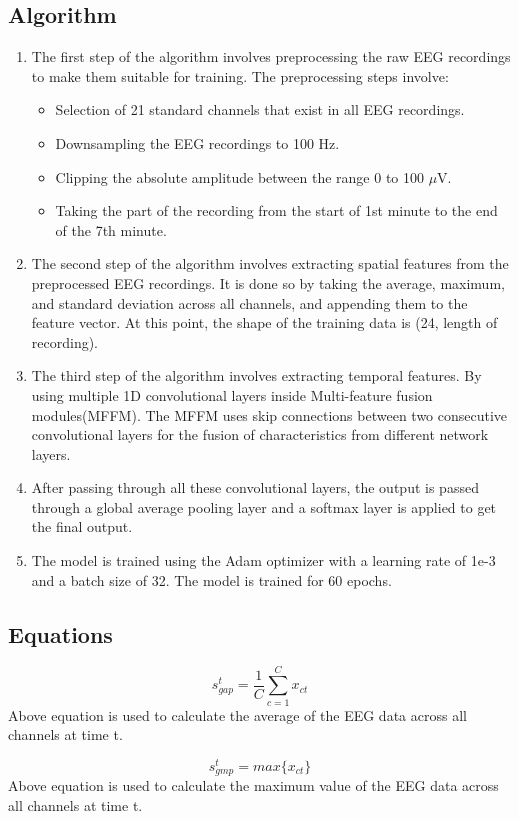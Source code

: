 \documentclass[10pt]{article}
\begin{document}
\subsection{Algorithm} 
\begin{enumerate}
  \item The first step of the algorithm involves preprocessing the raw EEG recordings to make them suitable for training. The preprocessing steps involve:
  \begin{itemize}
    \item Selection of 21 standard channels that exist in all EEG recordings.
    \item Downsampling the EEG recordings to 100 Hz.
    \item Clipping the absolute amplitude between the range 0 to 100 $\mu$V.
    \item Taking the part of the recording from the start of 1st minute to the end of the 7th minute.
  \end{itemize}
  \item The second step of the algorithm involves extracting spatial features from the preprocessed EEG recordings. It is done so by taking the average, maximum, and standard deviation across all channels, and appending them to the feature vector. At this point, the shape of the training data is (24, length of recording).
  \item The third step of the algorithm involves extracting temporal features. By using multiple 1D convolutional layers inside Multi-feature fusion modules(MFFM). The MFFM uses skip connections between two consecutive convolutional layers for the fusion of characteristics from different network layers.
  \item After passing through all these convolutional layers, the output is passed through a global average pooling layer and a softmax layer is applied to get the final output.
  \item The model is trained using the Adam optimizer with a learning rate of 1e-3 and a batch size of 32. The model is trained for 60 epochs.
\end{enumerate}

\subsection{Equations}
\[ s_{gap}^t = \frac{1}{C} \sum_{c=1}^{C} x_{ct} \]
Above equation is used to calculate the average of the EEG data across all channels at time t.

\[ s_{gmp}^t = max\{x_{ct}\} \]
Above equation is used to calculate the maximum value of the EEG data across all channels at time t.
\end{document}
